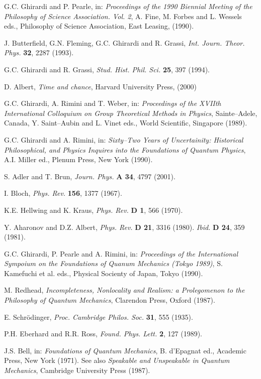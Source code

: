 \documentclass[12pt]{article}
\begin{document}
\begin{thebibliography}{999}
 G.C. Ghirardi and P. Pearle, in:  {\it Proceedings of
the 1990 Biennial Meeting of the Philosophy of Science
Association. Vol. 2}, A. Fine, M. Forbes and L. Wessels eds.,
Philosophy of Science Association, East Leasing, (1990).

 J. Butterfield, G.N. Fleming, G.C. Ghirardi and R.
Grassi, {\it Int. Journ. Theor. Phys.} {\bf 32}, 2287 (1993).

 G.C. Ghirardi and R. Grassi, {\it Stud. Hist. Phil.
Sci.} {\bf 25}, 397 (1994).

 D. Albert, {\it Time and chance}, Harvard
University Press, (2000)

 G.C. Ghirardi, A. Rimini and T. Weber, in: {\it
Proceedings of the XVIIth International Colloquium on Group
Theoretical Methods in Physics}, Sainte--Adele, Canada, Y.
Saint--Aubin and L. Vinet eds., World Scientific, Singapore
(1989).

 G.C. Ghirardi and A. Rimini, in: {\it Sixty--Two
Years of Uncertainity: Historical Philosophical, and Physics
Inquires into the Foundations of Quantum Physics}, A.I. Miller
ed., Plenum Press, New York (1990).

 S. Adler and T. Brun, {\it Journ. Phys.} {\bf A 34},
4797 (2001).

 I. Bloch, {\it Phys. Rev.} {\bf 156}, 1377 (1967).

 K.E. Hellwing and K. Kraus, {\it Phys. Rev.} {\bf D
1}, 566 (1970).

 Y. Aharonov and D.Z. Albert, {\it Phys. Rev.} {\bf D
21}, 3316 (1980). {\it Ibid.} {\bf D 24}, 359 (1981).

 G.C. Ghirardi, P. Pearle and A. Rimini, in: {\it
Proceedings of the International Sympoium on the Foundations of
Quanum Mechanics (Tokyo 1989)}, S. Kamefuchi et al. eds., Physical
Socienty of Japan, Tokyo (1990).

 M. Redhead, {\it Incompleteness, Nonlocality and
Realism: a Prolegomenon to the Philosophy of Quantum Mechanics},
Clarendon Press, Oxford (1987).

 E. Schr\"odinger, {\it Proc. Cambridge Philos.
Soc.} {\bf 31}, 555 (1935).

 P.H. Eberhard and R.R. Ross, {\it Found. Phys.
Lett.} {\bf 2}, 127 (1989).

 J.S. Bell, in: {\it Foundations of Quantum
Mechanics}, B. d'Epagnat ed., Academic Press, New York (1971). See
also {\it Speakable and Unspeakable in Quantum Mechanics},
Cambridge University Press (1987).


\end{thebibliography}
\end{document}
